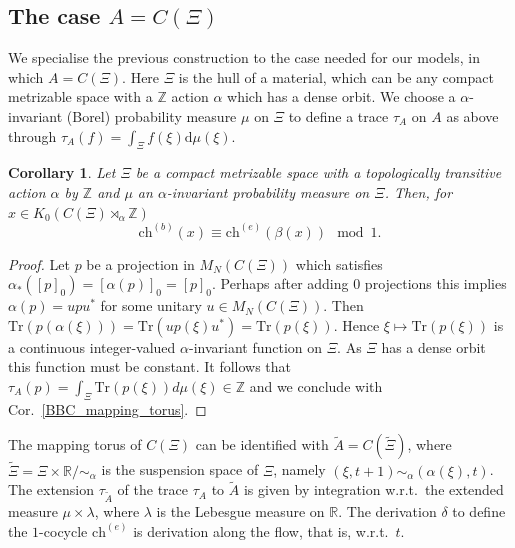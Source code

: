 \documentclass[11pt]{amsart}
\newtheorem{coro}[theorem]{Corollary}
\newcommand{\R}{\mathbb{R}}
\newcommand{\Z}{\mathbb{Z}}
\newcommand{\chb}{\text{ch}^{(b)}}
\newcommand{\che}{\text{ch}^{(e)}}
\begin{document}
\subsection{The case $A=C(\Xi)$}
We specialise the previous construction to the case needed for our models, in which $A=C(\Xi)$. Here $\Xi$ is the hull of a material, which can be any compact metrizable space with a $\Z$ action $\alpha$ which has a dense orbit. 
We choose a $\alpha$-invariant (Borel) 
probability measure $\mu$ on $\Xi$ to define a trace $\tau_A$ on $A$ as above through  $\tau_A(f)=\int_\Xi f(\xi)\mathrm{d}\mu(\xi)$.  
\begin{coro}\label{cor-chb=che1}
	Let $\Xi$ be a compact metrizable space with a topologically transitive action $\alpha$ by $\Z$ and $\mu$ an $\alpha$-invariant probability measure on $\Xi$. Then, for $x\in K_0(C(\Xi) \rtimes_\alpha \mathbb{Z})$ 
	$$\chb(x)\equiv \che(\beta(x)) \mod{1} .$$
\end{coro}

\begin{proof} Let $p$ be a projection in $M_N(C(\Xi))$ which satisfies $\alpha_*([p]_0)= [\alpha(p)]_0 = [p]_0$. Perhaps after adding $0$ projections this implies $\alpha(p)=upu^*$ for some unitary $u\in M_N(C(\Xi))$. Then $\mathrm{Tr}(p(\alpha(\xi))) = \mathrm{Tr} (up(\xi)u^*) = \mathrm{Tr} (p(\xi))$. Hence $\xi\mapsto \mathrm{Tr} (p(\xi)) $ is a continuous integer-valued $\alpha$-invariant function on $\Xi$. As $\Xi$ has a dense orbit this function must be constant. It follows that 
$\tau_A (p) = \int_\Xi \mathrm{Tr} (p(\xi)) d\mu(\xi)\in \Z$ and we conclude with Cor.~\ref{BBC_mapping_torus}.
\end{proof} 
The mapping torus of $C(\Xi)$ can be identified with $\tilde A = C(\tilde\Xi)$, where $\tilde \Xi=\Xi\times\R/\sim_\alpha$ is the suspension space of $\Xi$, namely $(\xi,t+1) \sim_\alpha (\alpha(\xi),t)$. The extension $\tau_{
\tilde A}$ of the trace $\tau_A$ to $\tilde A$ is given by integration w.r.t.\ the extended measure $\mu\times \lambda$, where $\lambda$ is the Lebesgue measure on $\R$. 
The derivation $\delta$ to define the $1$-cocycle $\che$ is derivation along the flow, that is, w.r.t.\ $t$. 
\end{document}
